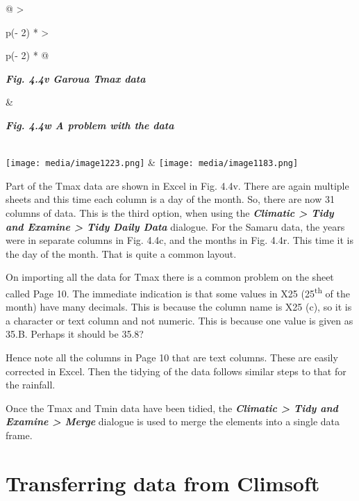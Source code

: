 \documentclass[
  letterpaper,
  DIV=11,
  numbers=noendperiod]{scrreprt}
\begin{document}
\begin{longtable}[]{@{}
  >{\raggedright\arraybackslash}p{(\columnwidth - 2\tabcolsep) * }
  >{\raggedright\arraybackslash}p{(\columnwidth - 2\tabcolsep) * }@{}}
\toprule\noalign{}
\begin{minipage}[b]{\linewidth}\raggedright
\textbf{\emph{Fig. 4.4v Garoua Tmax data}}
\end{minipage} & \begin{minipage}[b]{\linewidth}\raggedright
\textbf{\emph{Fig. 4.4w A problem with the data}}
\end{minipage} \\
\midrule\noalign{}
\endhead
\bottomrule\noalign{}
\endlastfoot
\texttt{[image: media/image1223.png]} &
\texttt{[image: media/image1183.png]} \\
\end{longtable}

Part of the Tmax data are shown in Excel in Fig. 4.4v. There are again
multiple sheets and this time each column is a day of the month. So,
there are now 31 columns of data. This is the third option, when using
the \textbf{\emph{Climatic \textgreater{} Tidy and Examine
\textgreater{} Tidy Daily Data}} dialogue. For the Samaru data, the
years were in separate columns in Fig. 4.4c, and the months in Fig.
4.4r. This time it is the day of the month. That is quite a common
layout.

On importing all the data for Tmax there is a common problem on the
sheet called Page 10. The immediate indication is that some values in
X25 (25\textsuperscript{th} of the month) have many decimals. This is
because the column name is X25 (c), so it is a character or text column
and not numeric. This is because one value is given as 35.B. Perhaps it
should be 35.8?

Hence note all the columns in Page 10 that are text columns. These are
easily corrected in Excel. Then the tidying of the data follows similar
steps to that for the rainfall.

Once the Tmax and Tmin data have been tidied, the \textbf{\emph{Climatic
\textgreater{} Tidy and Examine \textgreater{} Merge}} dialogue is used
to merge the elements into a single data frame.

\section{Transferring data from
Climsoft}\label{transferring-data-from-climsoft}
\end{document}
